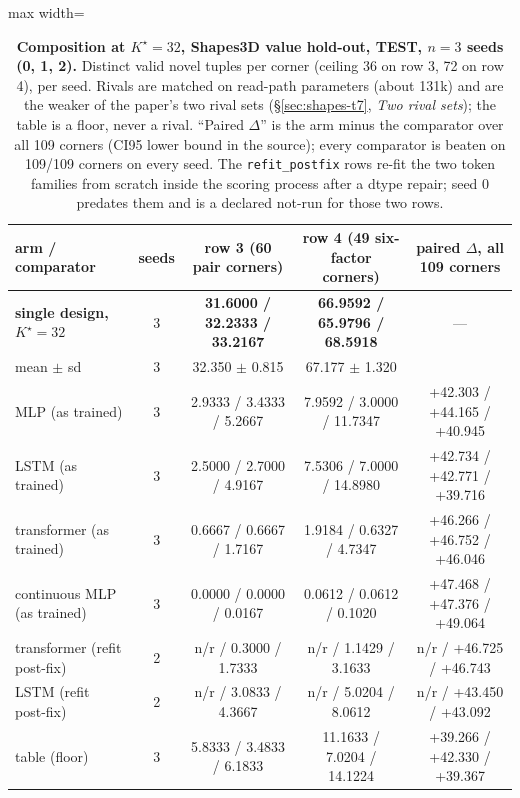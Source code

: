 \documentclass{article} %
\newcommand{\Kstar}{\ensuremath{K^{\star}}}
\begin{document}
\begin{table}[t]
\centering\small
\caption{\textbf{Composition at $\Kstar=32$, Shapes3D value hold-out, TEST, $n=3$ seeds
(0, 1, 2).} Distinct valid novel tuples per corner (ceiling 36 on row 3, 72 on row 4), per %
seed. Rivals are matched on read-path parameters (about 131k) and are the weaker of the paper's two rival sets (\S\ref{sec:shapes-t7}, \emph{Two rival sets}); the table is a floor, never a %
rival. ``Paired $\Delta$'' is the arm minus the comparator over all 109 corners (CI95 lower %
bound in the source); every comparator is beaten on 109/109 corners on every seed. The %
\texttt{refit\_postfix} rows re-fit the two token families from scratch inside the scoring
process after a dtype repair; seed 0 predates them and is a declared not-run for those two
rows.}
\label{tab:t7}
\setlength{\tabcolsep}{3.2pt}
\begin{adjustbox}{max width=\linewidth}\begin{tabular}{lcccc}
\toprule
arm / comparator & seeds & row 3 (60 pair corners) & row 4 (49 six-factor corners) & paired $\Delta$, all 109 corners \\ %
\midrule
\textbf{single design, $\Kstar=32$} & 3 & \textbf{31.6000 / 32.2333 / 33.2167} & \textbf{66.9592 / 65.9796 / 68.5918} & --- \\
\quad mean $\pm$ sd & 3 & 32.350 $\pm$ 0.815 & 67.177 $\pm$ 1.320 & \\
MLP (as trained) & 3 & 2.9333 / 3.4333 / 5.2667 & 7.9592 / 3.0000 / 11.7347 & +42.303 / +44.165 / +40.945 \\
LSTM (as trained) & 3 & 2.5000 / 2.7000 / 4.9167 & 7.5306 / 7.0000 / 14.8980 & +42.734 / +42.771 / +39.716 \\
transformer (as trained) & 3 & 0.6667 / 0.6667 / 1.7167 & 1.9184 / 0.6327 / 4.7347 & +46.266 / +46.752 / +46.046 \\
continuous MLP (as trained) & 3 & 0.0000 / 0.0000 / 0.0167 & 0.0612 / 0.0612 / 0.1020 & +47.468 / +47.376 / +49.064 \\
transformer (refit post-fix) & 2 & n/r / 0.3000 / 1.7333 & n/r / 1.1429 / 3.1633 & n/r / +46.725 / +46.743 \\
LSTM (refit post-fix) & 2 & n/r / 3.0833 / 4.3667 & n/r / 5.0204 / 8.0612 & n/r / +43.450 / +43.092 \\
table (floor) & 3 & 5.8333 / 3.4833 / 6.1833 & 11.1633 / 7.0204 / 14.1224 & +39.266 / +42.330 / +39.367 \\

\end{tabular}
\end{adjustbox}
\end{table}
\end{document}

